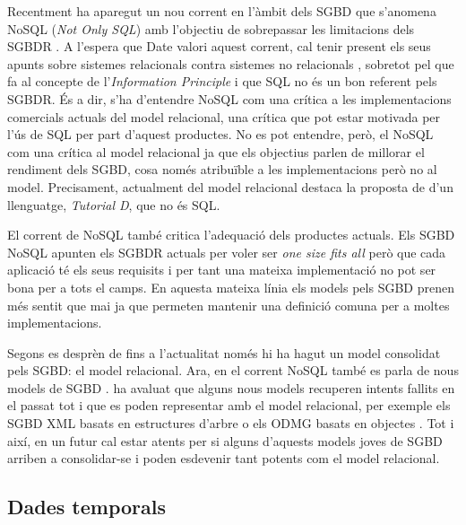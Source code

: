 Recentment ha aparegut un nou corrent en l'àmbit dels SGBD que
s'anomena NoSQL (\emph{Not Only SQL}) amb l'objectiu de sobrepassar
les limitacions dels SGBDR \parencite{edlich:nosql,stonebraker10}.  A
l'espera que Date valori aquest corrent, cal tenir present els seus
apunts sobre sistemes relacionals contra sistemes no
relacionals \parencite[part 7]{date06}, sobretot pel que fa al
concepte de l'\emph{Information Principle} i que SQL no és un bon
referent pels SGBDR. És a dir, s'ha d'entendre NoSQL com una crítica a
les implementacions comercials actuals del model relacional, una
crítica que pot estar motivada per l'ús de SQL per part d'aquest
productes.  No es pot entendre, però, el NoSQL com una crítica al
model relacional ja que els objectius parlen de millorar el rendiment
dels SGBD, cosa només atribuïble a les implementacions però no al
model. Precisament, actualment del model relacional destaca la
proposta de \citeauthor{date:tutoriald} d'un llenguatge,
\emph{Tutorial D}, que no és SQL.


El corrent de NoSQL també critica l'adequació dels productes actuals.
Els SGBD NoSQL apunten els SGBDR actuals per voler ser \emph{one size
  fits all} \parencite{stonebraker07,stonebraker09} però que cada
aplicació té els seus requisits i per tant una mateixa implementació
no pot ser bona per a tots el camps.  En aquesta mateixa línia els
models pels SGBD prenen més sentit que mai ja que permeten mantenir
una definició comuna per a moltes implementacions.


Segons es desprèn de \textcite{date06} fins a l'actualitat només hi ha
hagut un model consolidat pels SGBD: el model relacional.  Ara, en el
corrent NoSQL també es parla de nous models de
SGBD \parencite{edlich:nosql,stonebraker09:scidb}.
\citeauthor{date06} ha avaluat que alguns nous models recuperen
intents fallits en el passat tot i que es poden representar amb el
model relacional, per exemple els SGBD XML basats en estructures
d'arbre \parencite[cap.~14]{date06} \parencite[cap.~27]{date04:introduction8}
o els ODMG basats en objectes \parencite[cap.~27]{date06}. Tot i així,
en un futur cal estar atents per si alguns d'aquests models joves de
SGBD arriben a consolidar-se i poden esdevenir tant potents com el
model relacional.





\subsection{Dades temporals}

